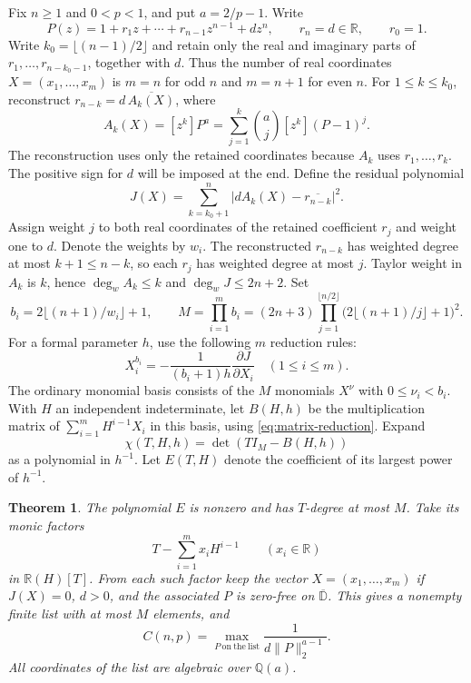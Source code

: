 \documentclass[11pt]{article}
\newtheorem{theorem}{Theorem}
\begin{document}
Fix \(n\geq1\) and \(0<p<1\), and put \(a=2/p-1\). Write
\[
 P(z)=1+r_1z+\cdots+r_{n-1}z^{n-1}+dz^n,
 \qquad r_n=d\in\mathbb R,\qquad r_0=1.
\]
Write \(k_0=\lfloor(n-1)/2\rfloor\) and retain only the real and
imaginary parts of \(r_1,\ldots,r_{n-k_0-1}\), together with \(d\).
Thus the number of real coordinates \(X=(x_1,\ldots,x_m)\) is
\(m=n\) for odd \(n\) and \(m=n+1\) for even \(n\).
For \(1\leq k\leq k_0\), reconstruct
\(r_{n-k}=d\,\overline{A_k(X)}\), where
\[
 A_k(X)=[z^k]P^a
   =\sum_{j=1}^{k}\binom aj [z^k](P-1)^j .
\]
The reconstruction uses only the retained coordinates because
\(A_k\) uses \(r_1,\ldots,r_k\). The positive sign for \(d\) will
be imposed at the end. Define the residual polynomial
\[
 J(X)=\sum_{k=k_0+1}^n
           \left|dA_k(X)-\overline{r_{n-k}}\right|^2 .
\]
Assign weight \(j\) to both real coordinates of the retained
coefficient \(r_j\) and weight one to \(d\). Denote the weights
by \(w_i\). The reconstructed \(r_{n-k}\) has weighted degree
at most \(k+1\leq n-k\), so each \(r_j\) has weighted degree
at most \(j\). Taylor weight in \(A_k\) is \(k\), hence
\(\deg_w A_k\leq k\) and \(\deg_w J\leq 2n+2\).
Set
\[
 b_i=2\lfloor(n+1)/w_i\rfloor+1,\qquad
 M=\prod_{i=1}^m b_i
   =(2n+3)\prod_{j=1}^{\lfloor n/2\rfloor}
        \bigl(2\lfloor(n+1)/j\rfloor+1\bigr)^2 .
\]
For a formal parameter \(h\),
use the following \(m\) reduction rules:
\begin{equation}\label{eq:matrix-reduction}
 X_i^{b_i}=-\frac{1}{(b_i+1)h}\frac{\partial J}{\partial X_i}
       \quad (1\leq i\leq m).
\end{equation}
The ordinary monomial basis consists of the \(M\) monomials
\(X^\nu\) with \(0\leq\nu_i<b_i\). With \(H\) an independent
indeterminate, let \(B(H,h)\) be the multiplication matrix of
\(\sum_{i=1}^m H^{i-1}X_i\) in this basis, using
\eqref{eq:matrix-reduction}. Expand
\[
 \chi(T,H,h)=\det(TI_M-B(H,h))
\]
as a polynomial in \(h^{-1}\). Let \(E(T,H)\) denote the
coefficient of its largest power of \(h^{-1}\).

\begin{theorem}\label{thm:matrix-all-n}
The polynomial \(E\) is nonzero and has \(T\)-degree at most
\(M\). Take its monic factors
\[
 T-\sum_{i=1}^m x_i H^{i-1}\qquad (x_i\in\mathbb R)
\]
in \(\mathbb R(H)[T]\). From each such factor keep the vector
\(X=(x_1,\ldots,x_m)\) if \(J(X)=0\), \(d>0\), and the
associated \(P\) is zero-free on \(\overline{\mathbb D}\).
This gives a nonempty finite list with at most \(M\) elements,
and
\[
 C(n,p)=
 \max_{P\ \mathrm{on\ the\ list}}
      \frac{1}{d\|P\|_2^{a-1}} .
\]
All coordinates of the list are algebraic over \(\mathbb Q(a)\).
\end{theorem}
\end{document}
